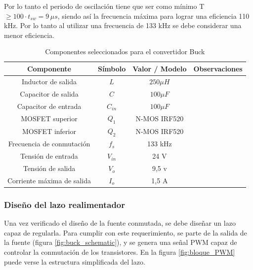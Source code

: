 \documentclass[]{article}
\begin{document}
	Por lo tanto el periodo de oscilación tiene que ser como mínimo T $ \geq   100 \cdot t_{sw} = 9 \, \mu s$, siendo así la frecuencia máxima para lograr una eficiencia 110 kHz. Por lo tanto al utilizar una frecuencia de 133 kHz se debe considerar una menor eficiencia.
	
	
	
	\begin{table}[H]
		\centering
		\caption{Componentes seleccionados para el convertidor Buck}
		\renewcommand{\arraystretch}{1.5}
		\begin{tabular}{|c|c|c|c|}
			\hline
			\textbf{Componente} & \textbf{Símbolo} & \textbf{Valor / Modelo} & \textbf{Observaciones} \\
			\hline
			
			Inductor de salida & \(L\) & $250 \mu H $&  \\
			\hline
			
			Capacitor de salida & \(C\) & $100 \mu F$ &  \\
			\hline
			
			Capacitor de entrada & \(C_{in}\) & $100 \mu F$ &  \\
			\hline
			
			MOSFET superior & \(Q_1\) & N-MOS IRF520  &  \\
			\hline
			
			MOSFET inferior & \(Q_2\) & N-MOS IRF520  &  \\
			\hline
			
			Frecuencia de conmutación & \(f_s\) & 133 kHz&  \\
			\hline
			
			Tensión de entrada & \(V_{in}\) & 24 V &  \\
			\hline
			
			Tensión de salida & \(V_o\) & 9,5 v  &  \\
			\hline
			
			Corriente máxima de salida & \(I_o\) & 1,5 A &  \\
			\hline
			
		\end{tabular}
		\label{tab:componentes_buck}
	\end{table}
	
	\subsubsection{Diseño del lazo realimentador}
	
	Una vez verificado el diseño de la fuente conmutada, se debe diseñar un lazo capaz de regularla. Para cumplir con este requerimiento, se parte de la salida de la fuente (figura \ref{fig:buck_schematic}), y se genera una señal PWM capaz de controlar la conmutación de los transistores. En la figura \ref{fig:bloque_PWM} puede verse la estructura simplificada del lazo.
	
\end{document}
